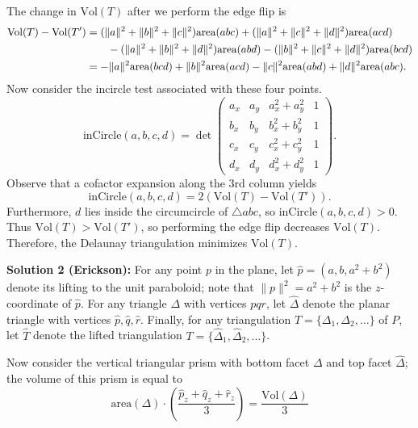 \documentclass{article}
\begin{document}
\begin{enumerate}
    \vspace{3mm}
    The change in \( \text{Vol}(T) \) after we perform the edge flip is 
    $$\begin{aligned}
        \text{Vol}(T) - \text{Vol}(T') &= (\|a\|^2 + \|b\|^2 + \|c\|^2)\text{area}(abc) + (\|a\|^2 + \|c\|^2 + \|d\|^2)\text{area}(acd) \\
        &\hspace{7mm} - (\|a\|^2 + \|b\|^2 + \|d\|^2)\text{area}(abd) - (\|b\|^2 + \|c\|^2 + \|d\|^2)\text{area}(bcd) \\
        &= -\|a\|^2\text{area}(bcd) + \|b\|^2\text{area}(acd) - \|c\|^2\text{area}(abd) + \|d\|^2\text{area}(abc).
    \end{aligned}$$
    Now consider the incircle test associated with these four points.
    $$\text{inCircle}(a,b,c,d) = \det 
    \begin{pmatrix}
        a_x & a_y & a_x^2 + a_y^2 & 1 \\
        b_x & b_y & b_x^2 + b_y^2 & 1 \\
        c_x & c_y & c_x^2 + c_y^2 & 1 \\
        d_x & d_y & d_x^2 + d_y^2 & 1
    \end{pmatrix}.$$
    Observe that a cofactor expansion along the 3rd column yields
    $$\text{inCircle}(a,b,c,d) = 2(\text{Vol}(T) - \text{Vol}(T')).$$
    Furthermore, \( d \) lies inside the circumcircle of \( \triangle abc \), so $\text{inCircle}(a,b,c,d) > 0$. Thus \( \text{Vol}(T) > \text{Vol}(T') \), so performing the edge flip decreases \( \text{Vol}(T) \). Therefore, the Delaunay triangulation minimizes \( \text{Vol}(T) \).
    
    \begin{tcolorbox}[colback=ForestGreen!2, colframe=ForestGreen!20]
        \textbf{Solution 2 (Erickson):} For any point \( p \) in the plane, let \( \hat{p} = (a, b, a^2 + b^2) \) denote its lifting to the unit paraboloid; note that \( \|p\|^2 = a^2 + b^2 \) is the \( z \)-coordinate of \( \hat{p} \). For any triangle \( \Delta \) with vertices \( pqr \), let \( \hat{\Delta} \) denote the planar triangle with vertices \( \hat{p}, \hat{q}, \hat{r} \). Finally, for any triangulation \( T = \{\Delta_1, \Delta_2, \ldots\} \) of \( P \), let \( \hat{T} \) denote the lifted triangulation \( T = \{\hat{\Delta}_1, \hat{\Delta}_2, \ldots\} \).

        \vspace{3mm}
        Now consider the vertical triangular prism with bottom facet \( \Delta \) and top facet \( \hat{\Delta} \); the volume of this prism is equal to
        \[ \text{area}(\Delta) \cdot \left( \frac{\hat{p}_{z} + \hat{q}_{z} + \hat{r}_{z} }{3} \right) = \frac{\text{Vol}(\Delta)}{3} \]


\end{tcolorbox}
\end{enumerate}
\end{document}
